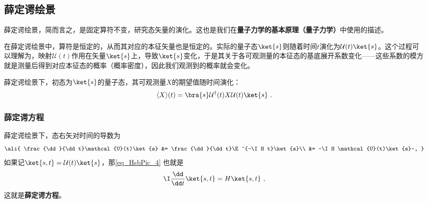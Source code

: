 
\subsection{薛定谔绘景}

薛定谔绘景，简而言之，是固定算符不变，研究态矢量的演化。这也是我们在\textbf{量子力学的基本原理（量子力学）}中使用的描述。

在薛定谔绘景中，算符是恒定的，从而其对应的本征矢量也是恒定的。实际的量子态$\ket{s}$则随着时间$t$演化为$\mathcal{U}(t)\ket{s}$。这个过程可以理解为，映射$\mathcal{U}(t)$作用在矢量$\ket{s}$上，导致$\ket{s}$变化，于是其关于各可观测量的本征态的基底展开系数变化——这些系数的模方就是测量后得到对应本征态的概率（概率密度），因此我们观测到的概率就会变化。


薛定谔绘景下，初态为$\ket{s}$的量子态，其可观测量$X$的期望值随时间演化：
\begin{equation}
\langle X \rangle(t) = \bra{s}\mathcal{U}^\dagger(t)X\mathcal{U}(t)\ket{s}~.
\end{equation}

\subsubsection{薛定谔方程}

薛定谔绘景下，态右矢对时间的导数为
\begin{equation}\label{eq_HsbPic_4}
\ali{
    \frac{\dd}{\dd t}\mathcal{U}(t)\ket{s} &= \frac{\dd}{\dd t}\E^{-\I H t}\ket{s}\\
    &= -\I H \mathcal{U}(t)\ket{s}~,
}
\end{equation}
如果记$\ket{s, t}=\mathcal{U}(t)\ket{s}$，那\autoref{eq_HsbPic_4} 也就是
\begin{equation}\label{eq_HsbPic_5}
\I \frac{\dd}{\dd t}\ket{s, t} = H\ket{s, t}~,
\end{equation}
这就是\textbf{薛定谔方程}。








